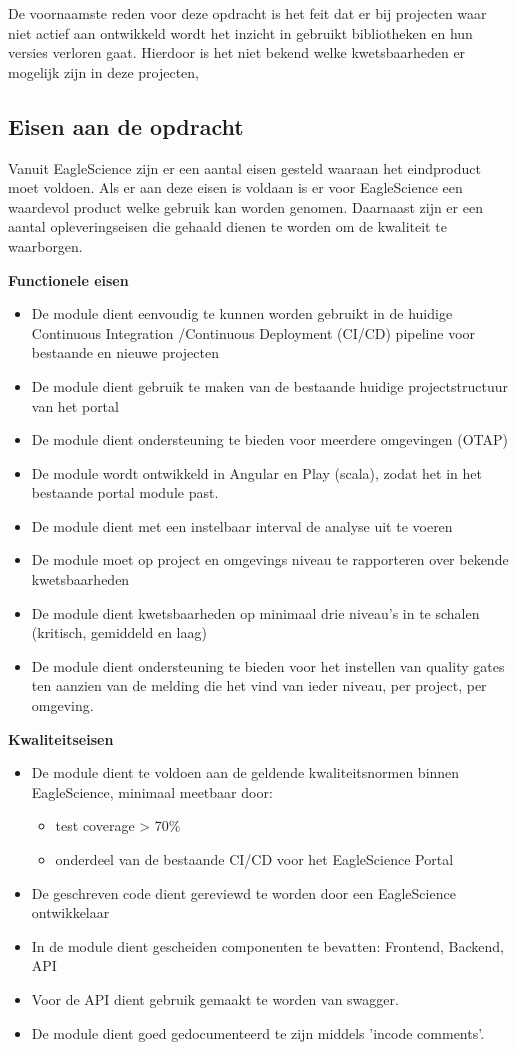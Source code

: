 De voornaamste reden voor deze opdracht is het feit dat er bij projecten waar niet actief aan ontwikkeld wordt het inzicht in gebruikt bibliotheken en hun versies verloren gaat. Hierdoor is het niet bekend welke kwetsbaarheden er mogelijk zijn in deze projecten,
\subsection{Eisen aan de opdracht}\label{subsec: eisen-aan-de-opdracht}
Vanuit EagleScience zijn er een aantal eisen gesteld waaraan het eindproduct moet voldoen. Als er aan deze eisen is voldaan is er voor EagleScience een waardevol product welke gebruik kan worden genomen. Daarnaast zijn er een aantal opleveringseisen die gehaald dienen te worden om de kwaliteit te waarborgen.

\textbf{Functionele eisen}
\begin{itemize}
\item De module dient eenvoudig te kunnen worden gebruikt in de huidige Continuous Integration /Continuous Deployment (CI/CD) pipeline voor bestaande en nieuwe projecten
\item De module dient gebruik te maken van de bestaande huidige projectstructuur van het portal
\item De module dient ondersteuning te bieden voor meerdere omgevingen (OTAP)
\item De module wordt ontwikkeld in Angular en Play (scala), zodat het in het bestaande portal module past.
\item De module dient met een instelbaar interval de analyse uit te voeren
\item De module moet op project en omgevings niveau te rapporteren over bekende kwetsbaarheden
\item De module dient kwetsbaarheden op minimaal drie niveau’s in te schalen (kritisch, gemiddeld en laag)
\item De module dient ondersteuning te bieden voor het instellen van quality gates ten aanzien van de melding die het vind van ieder niveau, per project, per omgeving.
\end{itemize}
\textbf{Kwaliteitseisen}
\begin{itemize}
\item De module dient te voldoen aan de geldende kwaliteitsnormen binnen EagleScience, minimaal meetbaar door:
	\begin{itemize}
	\item test coverage > 70\%
	\item onderdeel van de bestaande CI/CD voor het EagleScience Portal
	\end{itemize}
\item De geschreven code dient gereviewd te worden door een EagleScience ontwikkelaar
\item In de module dient gescheiden componenten te bevatten: Frontend, Backend, API
\item Voor de API dient gebruik gemaakt te worden van swagger.
\item De module dient goed gedocumenteerd te zijn middels 'incode comments'.
\end{itemize}


